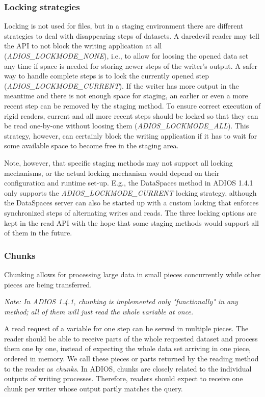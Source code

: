 \subsubsection{Locking strategies}
Locking is not used for files, but in a staging environment there are different strategies to deal with disappearing steps of datasets. A daredevil reader may tell the API to not block the writing application at all ({\em ADIOS\_LOCKMODE\_NONE}), i.e., to allow for loosing the opened data set any time if space is needed for storing newer steps of the writer's output. A safer way to handle complete steps is to lock the currently opened step ({\em ADIOS\_LOCKMODE\_CURRENT}). If the writer has more output in the meantime and there is not enough space for staging, an earlier or even a more recent step can be removed by the staging method. To ensure correct execution of  rigid readers, current and all more recent steps should be locked so that they can be read one-by-one without loosing them ({\em ADIOS\_LOCKMODE\_ALL}). This strategy, however, can certainly block the writing application if it has to wait for some available space to become free in the staging area.

Note, however, that specific staging methods may not support all locking mechanisms, or the actual locking mechanism would depend on their configuration and runtime set-up. E.g., the DataSpaces method in ADIOS 1.4.1 only supports the {\em ADIOS\_LOCKMODE\_CURRENT} locking strategy, although the DataSpaces server can also be started up with a custom locking that enforces synchronized steps of alternating writes and reads. The three locking options are kept in the read API with the hope that some staging methods would support all of them in the future. 

\subsubsection{Chunks}
Chunking allows for processing large data in small pieces concurrently while other pieces are being transferred.

\emph{Note: In ADIOS 1.4.1, chunking is implemented only "functionally" in any method; all of them will just read the whole variable at once.}

A read request of a variable for one step can be served in multiple pieces. The reader should be able to receive parts of the whole requested dataset and process them one by one, instead of expecting the whole data set arriving in one piece, ordered in memory. We call these pieces or parts returned by the reading method to the reader as \emph{chunks}. In ADIOS, chunks are closely related to the individual outputs of writing processes. Therefore, readers should expect to receive one chunk per writer whose output partly matches the query.

